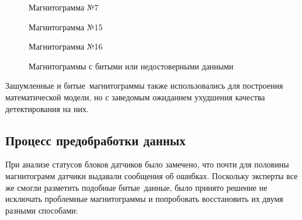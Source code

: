 \documentclass[a4paper,article,14pt]{extarticle}
\begin{document}
\begin{figure}[h!]
\begin{minipage}[h]{0.9\linewidth}
    \end{minipage}
    \vfill
    \begin{minipage}[h]{0.9\linewidth}
     Магнитограмма №7 \\
    \end{minipage}
    \vfill
    \begin{minipage}[h]{0.9\linewidth}
     Магнитограмма №15 \\
    \end{minipage}
    \vfill
    \begin{minipage}[h]{0.9\linewidth}
     Магнитограмма №16 \\
    \end{minipage}
    \caption{Магнитограммы с битыми или недостоверными данными}
    \label{image6}
\end{figure}

Зашумленные и \flqq битые\frqq\, магнитограммы также использовались для построения математической модели, но с заведомым ожиданием ухудшения качества детектирования на них.

\subsection{Процесс предобработки данных}

При анализе статусов блоков датчиков было замечено, что почти для половины магнитограмм 
датчики выдавали сообщения об ошибках. Поскольку эксперты все же смогли разметить подобные \flqq битые\frqq\,
данные, было принято решение не исключать проблемные магнитограммы и попробовать восстановить их двумя разными способами:
\end{document}
